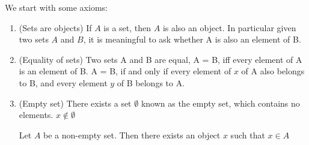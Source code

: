 \documentclass[11pt]{report}
\begin{document}
We start with some axioms:
\begin{enumerate}
        \item (Sets are objects) If $A$ is a set, then $A$ is also an object. In particular given two sets $A$ and $B$, it is meaningful to ask whether A is also an element of B.
        \item (Equality of sets) Two sets A and B are equal, A = B, iff every element of A is an element of B. A = B, if and only if every element of $x$ of A also belongs to B, and every element $y$ of B belongs to A.
        \item (Empty set) There exists a set $\emptyset$ known as the empty set, which contains no elements. $x \notin \emptyset$
\begin{lemma}
        Let $A$ be a non-empty set. Then there exists an object $x$ such that $x \in A$
\end{lemma}
\end{enumerate}
\end{document}
